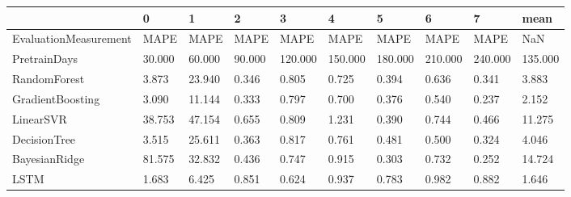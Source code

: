 \begin{tabular}{llllllllll}
\toprule
{} &      0 &      1 &      2 &       3 &       4 &       5 &       6 &       7 &    mean \\
\midrule
EvaluationMeasurement &   MAPE &   MAPE &   MAPE &    MAPE &    MAPE &    MAPE &    MAPE &    MAPE &     NaN \\
PretrainDays          & 30.000 & 60.000 & 90.000 & 120.000 & 150.000 & 180.000 & 210.000 & 240.000 & 135.000 \\
RandomForest          &  3.873 & 23.940 &  0.346 &   0.805 &   0.725 &   0.394 &   0.636 &   0.341 &   3.883 \\
GradientBoosting      &  3.090 & 11.144 &  0.333 &   0.797 &   0.700 &   0.376 &   0.540 &   0.237 &   2.152 \\
LinearSVR             & 38.753 & 47.154 &  0.655 &   0.809 &   1.231 &   0.390 &   0.744 &   0.466 &  11.275 \\
DecisionTree          &  3.515 & 25.611 &  0.363 &   0.817 &   0.761 &   0.481 &   0.500 &   0.324 &   4.046 \\
BayesianRidge         & 81.575 & 32.832 &  0.436 &   0.747 &   0.915 &   0.303 &   0.732 &   0.252 &  14.724 \\
LSTM                  &  1.683 &  6.425 &  0.851 &   0.624 &   0.937 &   0.783 &   0.982 &   0.882 &   1.646 \\
\bottomrule
\end{tabular}
